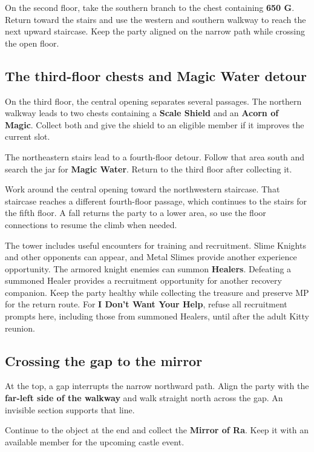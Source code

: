 On the second floor, take the southern branch to the chest containing
\textbf{650 G}. Return toward the stairs and use the western and
southern walkway to reach the next upward staircase. Keep the party
aligned on the narrow path while crossing the open floor.

\subsection*{The third-floor chests and Magic Water detour}

On the third floor, the central opening separates several passages.
The northern walkway leads to two chests containing a
\textbf{Scale Shield} and an \textbf{Acorn of Magic}. Collect both
and give the shield to an eligible member if it improves the current slot.

The northeastern stairs lead to a fourth-floor detour. Follow that
area south and search the jar for \textbf{Magic Water}. Return to
the third floor after collecting it.

Work around the central opening toward the northwestern staircase.
That staircase reaches a different fourth-floor passage, which continues
to the stairs for the fifth floor. A fall returns the party to a lower
area, so use the floor connections to resume the climb when needed.

The tower includes useful encounters for training and recruitment.
Slime Knights and other opponents can appear, and Metal Slimes provide
another experience opportunity. The armored knight enemies can summon
\textbf{Healers}. Defeating a summoned Healer provides a recruitment
opportunity for another recovery companion. Keep the party healthy while
collecting the treasure and preserve MP for the return route.
For \textbf{I Don't Want Your Help}, refuse all recruitment prompts here,
including those from summoned Healers, until after the adult Kitty reunion.

\subsection*{Crossing the gap to the mirror}

At the top, a gap interrupts the narrow northward path. Align the
party with the \textbf{far-left side of the walkway} and walk straight
north across the gap. An invisible section supports that line.

Continue to the object at the end and collect the \textbf{Mirror of Ra}.
Keep it with an available member for the upcoming castle event.

